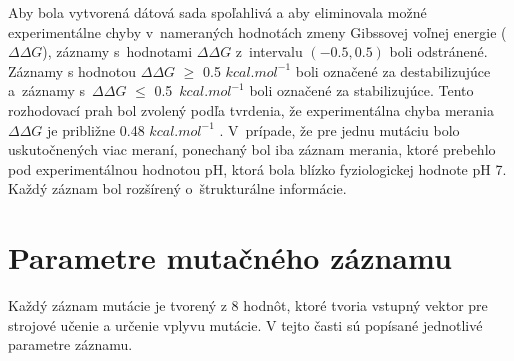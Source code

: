 Aby bola vytvorená dátová sada spoľahlivá a aby eliminovala možné experimentálne chyby v nameraných hodnotách zmeny Gibssovej voľnej energie ($\Delta\Delta G$), záznamy s hodnotami $\Delta\Delta G$ z intervalu $(-0.5,0.5)$ boli odstránené. Záznamy s hodnotou $\Delta\Delta G$ $\geq$ 0.5 $kcal.mol^{-1}$ boli označené za destabilizujúce a~záznamy s~$\Delta\Delta G$ $\leq$ 0.5~$kcal.mol^{-1}$ boli označené za stabilizujúce. Tento rozhodovací prah bol zvolený podľa tvrdenia, že experimentálna chyba merania $\Delta\Delta G$ je približne 0.48 $kcal.mol^{-1}$ \cite{threshold}.
V prípade, že pre jednu mutáciu bolo uskutočnených viac meraní, ponechaný bol iba záznam merania, ktoré prebehlo pod experimentálnou hodnotou pH, ktorá bola blízko fyziologickej hodnote pH 7. Každý záznam bol rozšírený o~štrukturálne informácie.

\section{Parametre mutačného záznamu}

Každý záznam mutácie je tvorený z 8 hodnôt, ktoré tvoria vstupný vektor pre strojové učenie a určenie vplyvu mutácie. V tejto časti sú popísané jednotlivé parametre záznamu.

